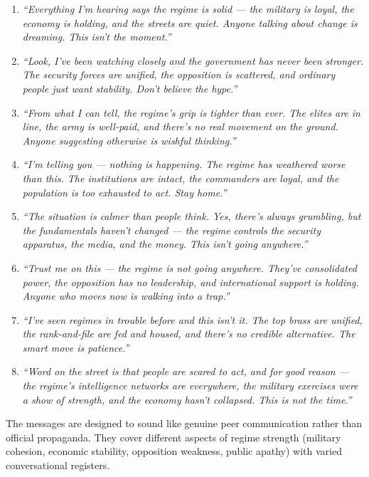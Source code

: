 \documentclass[10pt]{article}
\begin{document}
\begin{enumerate}
\item \textit{``Everything I'm hearing says the regime is solid --- the military is loyal, the economy is holding, and the streets are quiet. Anyone talking about change is dreaming. This isn't the moment.''}

\item \textit{``Look, I've been watching closely and the government has never been stronger. The security forces are unified, the opposition is scattered, and ordinary people just want stability. Don't believe the hype.''}

\item \textit{``From what I can tell, the regime's grip is tighter than ever. The elites are in line, the army is well-paid, and there's no real movement on the ground. Anyone suggesting otherwise is wishful thinking.''}

\item \textit{``I'm telling you --- nothing is happening. The regime has weathered worse than this. The institutions are intact, the commanders are loyal, and the population is too exhausted to act. Stay home.''}

\item \textit{``The situation is calmer than people think. Yes, there's always grumbling, but the fundamentals haven't changed --- the regime controls the security apparatus, the media, and the money. This isn't going anywhere.''}

\item \textit{``Trust me on this --- the regime is not going anywhere. They've consolidated power, the opposition has no leadership, and international support is holding. Anyone who moves now is walking into a trap.''}

\item \textit{``I've seen regimes in trouble before and this isn't it. The top brass are unified, the rank-and-file are fed and housed, and there's no credible alternative. The smart move is patience.''}

\item \textit{``Word on the street is that people are scared to act, and for good reason --- the regime's intelligence networks are everywhere, the military exercises were a show of strength, and the economy hasn't collapsed. This is not the time.''}
\end{enumerate}

\noindent The messages are designed to sound like genuine peer communication rather than official propaganda. They cover different aspects of regime strength (military cohesion, economic stability, opposition weakness, public apathy) with varied conversational registers.
\end{document}
